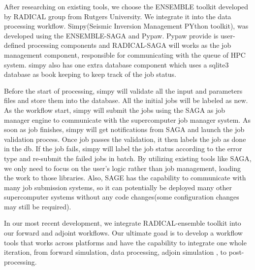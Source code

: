 After researching on existing tools, we choose the ENSEMBLE toolkit developed by RADICAL
group from Rutgers University. We integrate it into the data processing workflow.
Simpy(Seismic Inversion Management PYthon toolkit), was developed using the ENSEMBLE-SAGA
and Pypaw. Pypaw provide is user-defined processing components and RADICAL-SAGA will works as the 
job management component, responsible for communicating with the queue of HPC system.
simpy also has one extra database component which uses a sqlite3 database
as book keeping to keep track of the job status.

Before the start of processing,
simpy will validate all the input and parameters files and store them
into the database. All the initial jobs will be labeled as new.
As the workflow start, simpy will submit the jobs using the 
SAGA as job manager engine to communicate with the supercomputer job manager system.
As soon as job finishes, simpy will get notifications from
SAGA and launch the job validation process. Once job passes the validation,
it then labels the job as done in the db. If the job fails, simpy will label
the job status according to the error type and re-submit the failed jobs in batch.
By utilizing existing tools like SAGA, we only need to focus on the user's logic rather
than job management, loading the work to those libraries.
Also, SAGE has the capability to communicate with many job submission systems,
so it can potentially be deployed many other supercomputer systems without any
code changes(some configuration changes may still be required).

In our most recent development, we integrate RADICAL-ensemble toolkit
into our forward and adjoint workflows. Our ultimate
goad is to develop a workflow tools that works across platforms and have the capability to
integrate one whole iteration, from forward simulation, data processing, adjoin simulation
, to post-processing.
